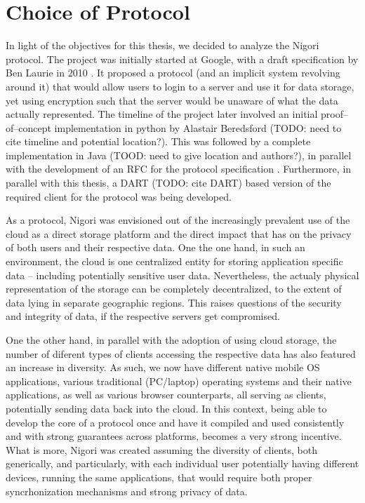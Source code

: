\section{Choice of Protocol}
In light of the objectives for this thesis, we decided to analyze the Nigori protocol.
The project was initially started at Google, with a draft specification by Ben Laurie in 2010 \cite{NigoriDraft}.
It proposed a protocol (and an implicit system revolving around it) that would allow users to login to a server and use it for data storage, yet using encryption such that the server would be unaware of what the data actually represented.
The timeline of the project later involved an initial proof--of--concept implementation in python by Alastair Beredsford (TODO: need to cite timeline and potential location?).
This was followed by a complete implementation in Java (TOOD: need to give location and authors?), in parallel with the development of an RFC for the protocol specification \cite{NigoriRFC}.
Furthermore, in parallel with this thesis, a DART (TODO: cite DART) based version of the required client for the protocol was being developed.

As a protocol, Nigori was envisioned out of the increasingly prevalent use of the cloud as a direct storage platform and the direct impact that has on the privacy of both users and their respective data.
One the one hand, in such an environment, the cloud is one centralized entity for storing application specific data -- including potentially sensitive user data.
Nevertheless, the actualy physical representation of the storage can be completely decentralized, to the extent of data lying in separate geographic regions.
This raises questions of the security and integrity of data, if the respective servers get compromised.

One the other hand, in parallel with the adoption of using cloud storage, the number of diferent types of clients accessing the respective data has also featured an increase in diversity.
As such, we now have different native mobile OS applications, various traditional (PC/laptop) operating systems and their native applications, as well as various browser counterparts, all serving as clients, potentially sending data back into the cloud.
In this context, being able to develop the core of a protocol once and have it compiled and used consistently and with strong guarantees across platforms, becomes a very strong incentive.
What is more, Nigori was created assuming the diversity of clients, both generically, and particularly, with each individual user potentially having different devices, running the same applications, that would require both proper syncrhonization mechanisms and strong privacy of data.

